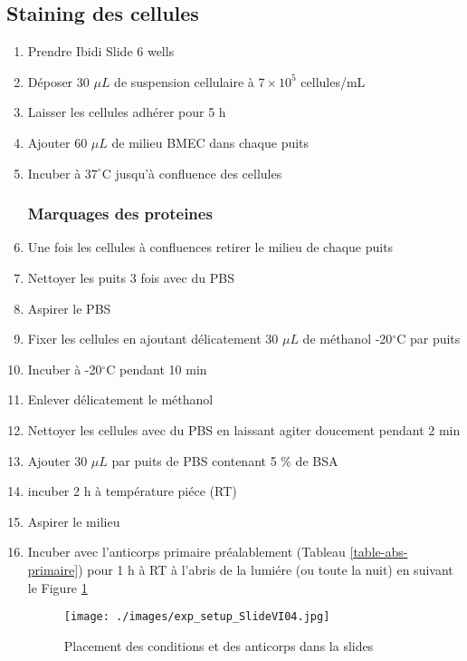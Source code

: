\subsection{Staining des cellules}

\begin{enumerate}
\subsubsection{Incubation des cellules dans les Ibidi Slides}
\item Prendre Ibidi Slide 6 wells
\item Déposer 30 $\mu L$ de suspension cellulaire à $7\times10^5$ cellules/mL
\item Laisser les cellules adhérer pour 5 h
\item Ajouter 60 $\mu L$ de milieu BMEC dans chaque puits
\item Incuber à $37^\circ$C jusqu'à confluence des cellules

\subsubsection{Marquages des proteines}

\item Une fois les cellules à confluences retirer le milieu de chaque puits
\item Nettoyer les puits 3 fois avec du PBS
\item Aspirer le PBS
\item Fixer les cellules en ajoutant délicatement 30 $\mu L$ de méthanol -20$^\circ$C par puits 
\item Incuber à -20$^\circ$C pendant 10 min
\item Enlever délicatement le méthanol 
\item Nettoyer les cellules avec du PBS en laissant agiter doucement pendant 2 min  
\item Ajouter 30 $\mu L$ par puits de PBS contenant 5 \% de BSA
\item incuber 2 h à température piéce (RT)
\item Aspirer le milieu
\item Incuber avec l'anticorps primaire préalablement (Tableau \ref{table-abs-primaire}) pour 1 h à RT à l'abris de la lumiére (ou toute la nuit) en suivant le Figure \ref{ibidi-slide-markage}

\begin{figure}[H]
    \texttt{[image: ./images/exp\_setup\_SlideVI04.jpg]}
    \caption{Placement des conditions et des anticorps dans la slides}
    \label{ibidi-slide-markage}
\end{figure}


\end{enumerate}

